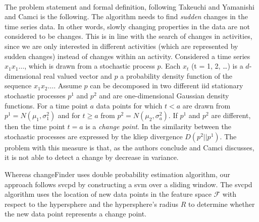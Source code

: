 \\
The problem statement and formal definition, following Takeuchi and Yamanishi \cite{takeuchi2006unifying} and Camci \cite{camci2010change} is the following.
The algorithm needs to find \emph{sudden} changes in the time series data.
In other words, slowly changing properties in the data are not considered to be changes.
This is in line with the search of changes in activities, since we are only interested in different activities (which are represented by sudden changes) instead of changes within an activity.
Considered a time series $x_1 x_1 \dots$, which is drawn from a stochastic process $p$.
Each $x_t$ (t = 1, 2, \dots) is a $d$-dimensional real valued vector and $p$ a probability density function of the sequence $x_1 x_2 \dots$.
Assume $p$ can be decomposed in two different \gls{iid} stationary stochastic processes $p^1$ and $p^2$ and are one-dimensional Gaussian density functions.
For a time point $a$ data points for which $t < a$ are drawn from $p^1 = N(\mu_1, \sigma_1^2)$ and for $t \geq a$ from $p^2 = N(\mu_2, \sigma_a^2)$.
If $p^1$ and $p^2$ are different, then the time point $t = a$ is a \emph{change point}.
In \cite{takeuchi2006unifying} the similarity between the stochastic processes are expressed by the \gls{kliep} divergence $D(p^2||p^1)$.
The problem with this measure is that, as the authors conclude and Camci discusses, it is not able to detect a change by decrease in variance.
\\

Whereas \gls{changeFinder} uses double probability estimation algorithm, our approach follows \gls{svcpd} by constructing a \gls{svm} over a sliding window.
The \gls{svcpd} algorithm uses the location of new data points in the feature space $\mathcal{F}$ with respect to the hypersphere and the hypersphere's radius $R$ to determine whether the new data point represents a change point.

